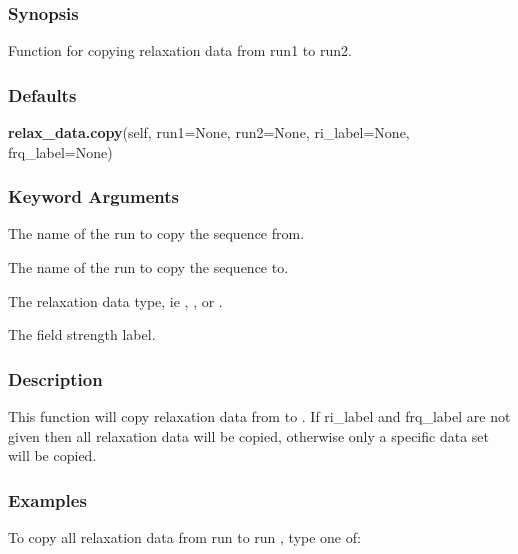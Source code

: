   
 \subsubsection{Synopsis} 

 Function for copying relaxation data from run1 to run2. 
  

  
 \subsubsection{Defaults} 

 \textsf{\textbf{relax\_data.copy}(self, run1=None, run2=None, ri\_label=None, frq\_label=None)} 

  
 \subsubsection{Keyword Arguments} 

   The name of the run to copy the sequence from.   

   The name of the run to copy the sequence to.   

   The relaxation data type, ie , , or .   

   The field strength label.  

  

  
 \subsubsection{Description} 

 This function will copy relaxation data from  to .  If ri\_label and frq\_label are not given then all relaxation data will be copied, otherwise only a specific data set will be copied. 
  

  
 \subsubsection{Examples} 

 To copy all relaxation data from run  to run , type one of: 
  


